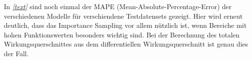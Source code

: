 In \textit{\autoref{text}} sind noch einmal der MAPE (Mean-Absolute-Percentage-Error) der verschiedenen Modelle für verschiendene Testdatensets gezeigt. Hier wird erneut deutlich, dass das Importance Sampling vor allem nützlich ist, wenn Bereiche mit hohen Funktionswerten besonders wichtig sind. Bei der Berechnung des totalen Wirkungsquerschnittes aus dem differentiellen Wirkungsquerschnitt ist genau dies der Fall.
\enlargethispage{3.cm}
\begin{figure}[H]
	\centering
	 \\

\end{figure}
